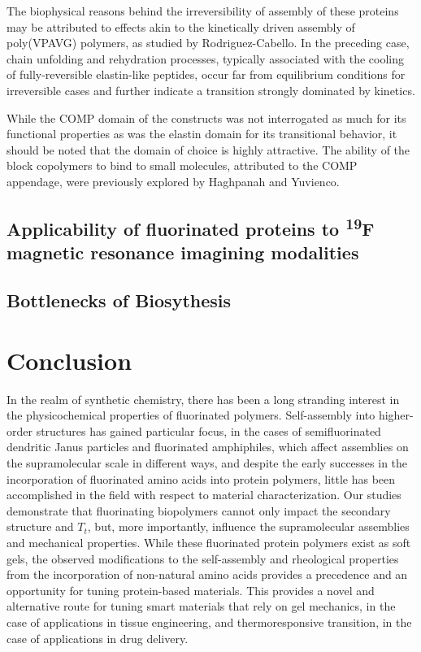\begin{refsection}
The biophysical reasons behind the irreversibility of assembly of these proteins
may be attributed to effects akin to the kinetically driven assembly of
poly(VPAVG) polymers, as studied by Rodriguez-Cabello.\cite{Reguera2003} In the
preceding case, chain unfolding and rehydration processes, typically associated
with the cooling of fully-reversible elastin-like peptides, occur far from
equilibrium conditions for irreversible cases and further indicate a transition
strongly dominated by kinetics.

While the COMP domain of the constructs was not interrogated as much for its
functional properties as was the elastin domain for its transitional behavior,
it should be noted that the domain of choice is highly attractive. The ability
of the block copolymers to bind to small molecules, attributed to the COMP
appendage, were previously explored by Haghpanah and Yuvienco.\cite{Haghpanah2010}

\subsection{Applicability of fluorinated proteins to \textsuperscript{19}F
magnetic resonance imagining modalities} 


\subsection{Bottlenecks of Biosythesis}


\section{Conclusion}

In the realm of synthetic chemistry, there has been a long stranding interest in
the physicochemical properties of fluorinated polymers. Self-assembly into
higher-order structures has gained particular focus, in the cases of
semifluorinated dendritic Janus particles and fluorinated amphiphiles, which
affect assemblies on the supramolecular scale in different ways, and
despite the early successes in the incorporation of fluorinated amino acids into
protein polymers, little has been accomplished in the field with respect to
material characterization. Our studies demonstrate that fluorinating biopolymers
cannot only impact the secondary structure and ${T_t}$, but, more importantly,
influence the supramolecular assemblies and mechanical properties. While these
fluorinated protein polymers exist as soft gels, the observed modifications to
the self-assembly and rheological properties from the incorporation of
non-natural amino acids provides a precedence and an opportunity for tuning
protein-based materials. This provides a novel and alternative route for tuning
smart materials that rely on gel mechanics, in the case of applications in
tissue engineering, and thermoresponsive transition, in the case of applications
in drug delivery. 

\printbibliography[heading=subbibliography]

\end{refsection}
